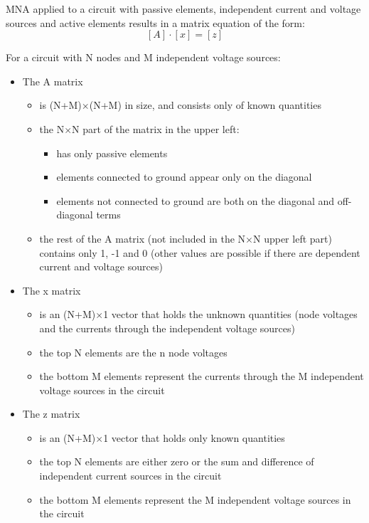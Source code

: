 \documentclass[10pt]{report}
\begin{document}
MNA applied to a circuit with passive elements, independent current
and voltage sources and active elements results in a matrix equation
of the form:
\begin{equation}
\left[A\right] \cdot \left[x\right] = \left[z\right]
\end{equation}

For a circuit with N nodes and M independent voltage sources:

\begin{itemize}

\item The A matrix
\begin{itemize}
\item
is (N+M)$\times$(N+M) in size, and consists only of known quantities
\item
the N$\times$N part of the matrix in the upper left:
\begin{itemize}
\item
has only passive elements
\item
elements connected to ground appear only on the diagonal
\item
elements not connected to ground are both on the diagonal and
off-diagonal terms
\end{itemize}
\item
the rest of the A matrix (not included in the N$\times$N upper left
part) contains only 1, -1 and 0 (other values are possible if there
are dependent current and voltage sources)
\end{itemize}

\item The x matrix
\begin{itemize}
\item
is an (N+M)$\times$1 vector that holds the unknown quantities (node
voltages and the currents through the independent voltage sources)
\item
the top N elements are the n node voltages
\item
the bottom M elements represent the currents through the M independent
voltage sources in the circuit
\end{itemize}

\item The z matrix
\begin{itemize}
\item
is an (N+M)$\times$1 vector that holds only known quantities
\item
the top N elements are either zero or the sum and difference of
independent current sources in the circuit
\item
the bottom M elements represent the M independent voltage sources in
the circuit
\end{itemize}
\end{itemize}
\end{document}
